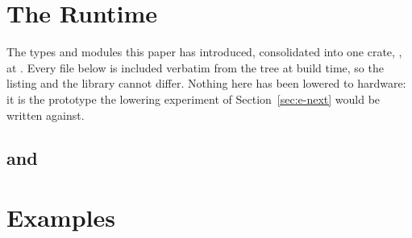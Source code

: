 \appendices

\section{The Runtime}
\label{app:runtime}

The types and modules this paper has introduced, consolidated into one
crate, , at . Every file below is included
verbatim from the tree at build time, so the listing and the library
cannot differ. Nothing here has been lowered to hardware: it is the
prototype the lowering experiment of Section~\ref{sec:e-next} would be
written against.

\subsection{}


\subsection{}


\subsection{ and }



\subsection{}


\section{Examples}
\label{app:examples}


